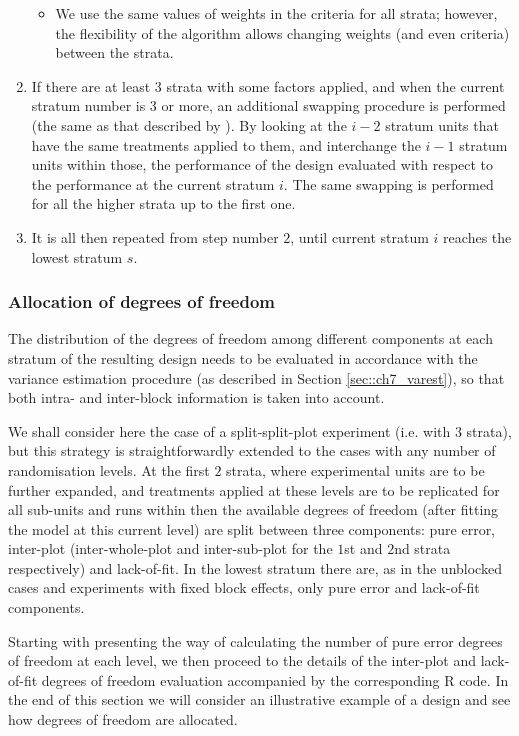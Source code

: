 \begin{enumerate}
\begin{itemize}
\item We use the same values of weights in the criteria for all strata; however, the flexibility of the algorithm allows changing weights (and even criteria) between the strata.
\end{itemize}
\item If there are at least $3$ strata with some factors applied, and when the current stratum number is $3$ or more, an additional swapping procedure is performed (the same as that described by \cite{Trinca2001multistratum}). By looking at the $i-2$ stratum units that have the same treatments applied to them, and interchange the $i-1$ stratum units within those, the performance of the design evaluated with respect to the performance at the current stratum $i$. The same swapping is performed for all the higher strata up to the first one.
\item It is all then repeated from step number $2$, until current stratum $i$ reaches the lowest stratum $s$. 
\end{enumerate}

\subsubsection{Allocation of degrees of freedom}

The distribution of the degrees of freedom among different components at each stratum of the resulting design needs to be evaluated in accordance with the variance estimation procedure (as described in Section \ref{sec::ch7_varest}), so that both intra- and inter-block information is taken into account. 

We shall consider here the case of a split-split-plot experiment (i.e. with $3$ strata), but this strategy is straightforwardly extended to the cases with any number of randomisation levels. At the first $2$ strata, where experimental units are to be further expanded, and treatments applied at these levels are to be replicated for all sub-units and runs within then the available degrees of freedom (after fitting the model at this current level) are split between three components: pure error, inter-plot (inter-whole-plot and inter-sub-plot for the $1$st and $2$nd strata respectively) and lack-of-fit. In the lowest stratum there are, as in the unblocked cases and experiments with fixed block effects, only pure error and lack-of-fit components.

Starting with presenting the way of calculating the number of pure error degrees of freedom at each level, we then proceed to the details of the inter-plot and lack-of-fit degrees of freedom evaluation accompanied by the corresponding R code. In the end of this section we will consider an illustrative example of a design and see how degrees of freedom are allocated.

